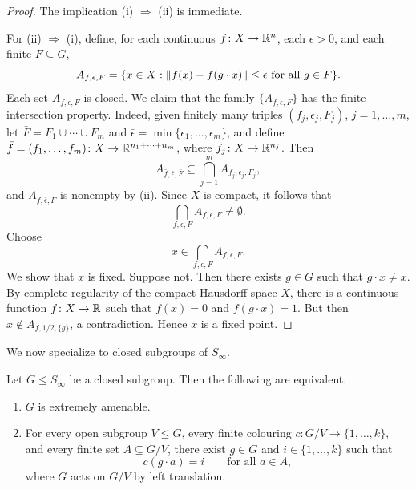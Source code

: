 \begin{proof}
    The implication (i) \(\Rightarrow\) (ii) is immediate.

    For (ii) \(\Rightarrow\) (i), define, for each continuous \(f \colon X \to \mathbb{R}^n\), each \(\epsilon>0\), and each finite \(F\subseteq G\),
    \[
        A_{f,\epsilon,F}
        =
        \{x\in X : \left\lVert f(x)-f(g\cdot x)\right\rVert\leq \epsilon \text{ for all } g\in F\}.
    \]
    Each set \(A_{f,\epsilon,F}\) is closed.
    We claim that the family \(\{A_{f,\epsilon,F}\}\) has the finite intersection property.
    Indeed, given finitely many triples \((f_j,\epsilon_j,F_j)\), \(j=1,\dots,m\), let \(\bar F=F_1\cup\cdots\cup F_m\) and \(\bar\epsilon=\min\{\epsilon_1,\dots,\epsilon_m\}\), and define \(\bar f=(f_1,\dots,f_m)\colon X \to \mathbb{R}^{n_1+\cdots+n_m}\), where \(f_j\colon X\to\mathbb{R}^{n_j}\).
    Then
    \[
        A_{\bar f,\bar\epsilon,\bar F}
        \subseteq
        \bigcap_{j=1}^m A_{f_j,\epsilon_j,F_j},
    \]
    and \(A_{\bar f,\bar\epsilon,\bar F}\) is nonempty by (ii).
    Since \(X\) is compact, it follows that
    \[
        \bigcap_{f,\epsilon,F} A_{f,\epsilon,F}\neq\emptyset.
    \]
    Choose
    \[
        x\in \bigcap_{f,\epsilon,F} A_{f,\epsilon,F}.
    \]
    We show that \(x\) is fixed. Suppose not. Then there exists \(g\in G\) such that \(g\cdot x\neq x\). By complete regularity of the compact Hausdorff space \(X\), there is a continuous function \(f\colon X\to\mathbb{R}\) such that \(f(x)=0\) and \(f(g\cdot x)=1\).
    But then \(x\notin A_{f,1/2,\{g\}}\), a contradiction. Hence \(x\) is a fixed point.
\end{proof}

We now specialize to closed subgroups of \(S_\infty\).

\begin{proposition}
    \label{prop:coset-characterization}
    Let \(G\leq S_\infty\) be a closed subgroup. Then the following are equivalent.
    \begin{enumerate}
        \item[(i)] \(G\) is extremely amenable.
        \item[(ii)] For every open subgroup \(V\leq G\), every finite colouring \(c\colon G/V\to\{1,\dots,k\}\), and every finite set \(A\subseteq G/V\), there exist \(g\in G\) and \(i\in\{1,\dots,k\}\) such that
              \[
                  c(g\cdot a)=i
                  \qquad\text{for all } a\in A,
              \]
              where \(G\) acts on \(G/V\) by left translation.
    \end{enumerate}
\end{proposition}


